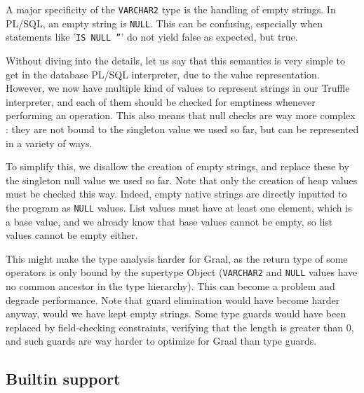 \documentclass[twoside,11pt,a4paper]{article}
\newcommand{\java}[1]{\textsf{#1}}
\newcommand{\pls}[1]{\small\texttt{#1}\normalsize}
\newcommand{\plstype}[1]{\pls{#1}}
\newcommand{\varchar}{\plstype{VARCHAR2}}
\newcommand{\plsnull}{\pls{NULL}}
\begin{document}
A major specificity of the \varchar{} type is the handling of empty strings. In PL/SQL, an empty string is \plsnull{}. This can be confusing, especially when statements like '\pls{IS NULL ''}' do not yield false as expected, but true.

Without diving into the details, let us say that this semantics is very simple to get in the database PL/SQL interpreter, due to the value representation. However, we now have multiple kind of values to represent strings in our Truffle interpreter, and each of them should be checked for emptiness whenever performing an operation. This also means that null checks are way more complex : they are not bound to the singleton value we used so far, but can be represented in a variety of ways.

To simplify this, we disallow the creation of empty strings, and replace these by the singleton null value we used so far. Note that only the creation of heap values must be checked this way. Indeed, empty native strings are directly inputted to the program as \plsnull{} values. List values must have at least one element, which is a base value, and we already know that base values cannot be empty, so list values cannot be empty either.

This might make the type analysis harder for Graal, as the return type of some operators is only bound by the supertype \java{Object} (\varchar{} and \plsnull{} values have no common ancestor in the type hierarchy). This can become a problem and degrade performance. Note that guard elimination would have become harder anyway, would we have kept empty strings. Some type guards would have been replaced by field-checking constraints, verifying that the length is greater than 0, and such guards are way harder to optimize for Graal than type guards.

\subsection{Builtin support}

\end{document}
